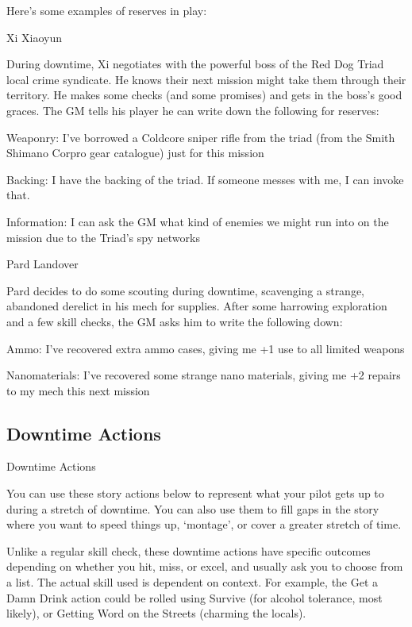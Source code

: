 Here’s some examples of reserves in play:


Xi Xiaoyun

During downtime, Xi negotiates with the powerful boss of the Red Dog Triad local crime
syndicate. He knows their next mission might take them through their territory. He makes some
checks (and some promises) and gets in the boss’s good graces. The GM tells his player he can
write down the following for reserves:

	        Weaponry: I’ve borrowed a Coldcore sniper rifle from the triad (from the Smith Shimano
Corpro gear catalogue) just for this mission

	        Backing: I have the backing of the triad. If someone messes with me, I can invoke that.

	        Information: I can ask the GM what kind of enemies we might run into on the mission
due to the Triad’s spy networks


Pard Landover

Pard decides to do some scouting during downtime, scavenging a strange, abandoned derelict
in his mech for supplies. After some harrowing exploration and a few skill checks, the GM asks
him to write the following down:

	        Ammo: I’ve recovered extra ammo cases, giving me +1 use to all limited weapons

	        Nanomaterials: I’ve recovered some strange nano materials, giving me +2 repairs to my
mech this next mission



\subsection{Downtime Actions}

                                           Downtime Actions


You can use these story actions below to represent what your pilot gets up to during a stretch of
downtime. You can also use them to fill gaps in the story where you want to speed things up,
‘montage’, or cover a greater stretch of time.


Unlike a regular skill check, these downtime actions have specific outcomes depending on
whether you hit, miss, or excel, and usually ask you to choose from a list. The actual skill used is
dependent on context. For example, the Get a Damn Drink action could be rolled using Survive
(for alcohol tolerance, most likely), or Getting Word on the Streets (charming the locals).



